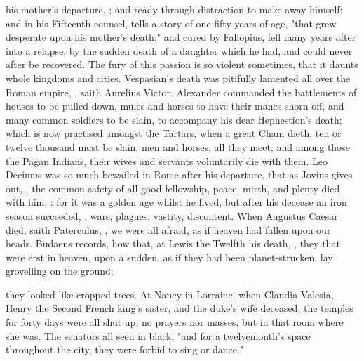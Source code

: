 his mother's departure, ; and ready through distraction to make away himself: and in his
Fifteenth counsel, tells a story of one fifty years of age, "that grew
desperate upon his mother's death;" and cured by Fallopius, fell many years
after into a relapse, by the sudden death of a daughter which he had, and could
never after be recovered. The fury of this passion is so violent sometimes,
that it daunts whole kingdoms and cities. Vespasian's death was pitifully
lamented all over the Roman empire, , saith Aurelius
Victor. Alexander commanded the battlements of houses to be pulled down, mules
and horses to have their manes shorn off, and many common soldiers to be slain,
to accompany his dear Hephestion's death; which is now practised amongst the
Tartars, when a great Cham dieth, ten or twelve thousand
must be slain, men and horses, all they meet; and among those the
Pagan Indians, their wives and servants voluntarily die
with them. Leo Decimus was so much bewailed in Rome after his departure, that
as Jovius gives out, , the common safety of all good fellowship, peace, mirth, and plenty
died with him, : for
it was a golden age whilst he lived, but after his decease
an iron season succeeded, , wars, plagues, vastity, discontent. When Augustus Caesar
died, saith Paterculus, , we were all afraid, as if
heaven had fallen upon our heads. Budaeus records, how
that, at Lewis the Twelfth his death, , they that were erst in heaven, upon a sudden, as if they had been
planet-strucken, lay grovelling on the ground;

they looked like cropped trees. At Nancy in Lorraine, when
Claudia Valesia, Henry the Second French king's sister, and the duke's wife
deceased, the temples for forty days were all shut up, no prayers nor masses,
but in that room where she was. The senators all seen in black, "and for a
twelvemonth's space throughout the city, they were forbid to sing or dance."

